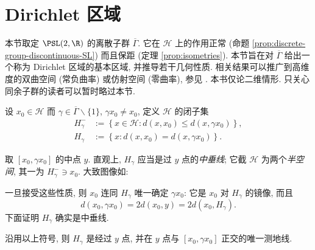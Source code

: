 \section{Dirichlet 区域}\label{sec:Dirichlet-domain}
本节取定 $\PSL(2,\R)$ 的离散子群 $\overline{\Gamma}$. 它在 $\mathcal{H}$ 上的作用正常 (命题 \ref{prop:discrete-group-discontinuous-SL}) 而且保距 (定理 \ref{prop:isometries}). 本节旨在对 $\overline{\Gamma}$ 给出一个称为 Dirichlet 区域的基本区域, 并推导若干几何性质. 相关结果可以推广到高维度的双曲空间 (常负曲率) 或仿射空间 (零曲率), 参见 \cite{Bea95, Kat10}. 本书仅论二维情形. 只关心同余子群的读者可以暂时略过本节.

\begin{definition} 
	设 $x_0 \in \mathcal{H}$ 而 $\gamma \in \overline{\Gamma} \smallsetminus \{1\}$, $\gamma x_0 \neq x_0$, 定义 $\mathcal{H}$ 的闭子集
	\begin{align*}
		H_\gamma^- & := \left\{ x \in \mathcal{H}: d(x, x_0) \leq d(x, \gamma x_0) \right\}, \\
		H_\gamma & := \left\{x: d(x,x_0) = d(x, \gamma x_0) \right\}.
	\end{align*}
\end{definition}
取 $[x_0, \gamma x_0]$ 的中点 $y$. 直观上, $H_\gamma$ 应当是过 $y$ 点的\emph{中垂线}; 它截 $\mathcal{H}$ 为两个\emph{半空间}, 其一为 $H_\gamma^- \ni x_0$. 大致图像如:
\begin{center}\end{center}
一旦接受这些性质, 则 $x_0$ 连同 $H_\gamma$ 唯一确定 $\gamma x_0$: 它是 $x_0$ 对 $H_\gamma$ 的镜像, 而且
\begin{equation}\label{eqn:bisector-d}
	d(x_0, \gamma x_0) = 2d(x_0, y) = 2d(x_0, H_\gamma).
\end{equation}
下面证明 $H_\gamma$ 确实是中垂线.
\begin{lemma}\label{prop:bisector}
	沿用以上符号, 则 $H_\gamma$ 是经过 $y$ 点, 并在 $y$ 点与 $[x_0, \gamma x_0]$ 正交的唯一测地线.
\end{lemma}
